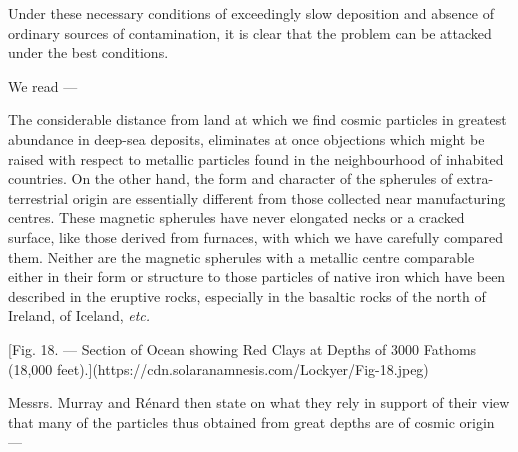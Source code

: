 \documentclass[a4paper, 12pt, oneside, polutonikogreek, english]{article}
\begin{document}
Under these necessary conditions of exceedingly slow deposition and absence of ordinary sources of contamination, it is clear that the problem can be attacked under the best conditions.

We read ---

The considerable distance from land at which we find cosmic particles in greatest abundance in deep-sea deposits, eliminates at once objections which might be raised with respect to metallic particles found in the neighbourhood of inhabited countries. On the other hand, the form and character of the spherules of extra-terrestrial origin are essentially different from those collected near manufacturing centres. These magnetic spherules have never elongated necks or a cracked surface, like those derived from furnaces, with which we have carefully compared them. Neither are the magnetic spherules with a metallic centre comparable either in their form or structure to those particles of native iron which have been described in the eruptive rocks, especially in the basaltic rocks of the north of Ireland, of Iceland, \emph{etc.}

[Fig. 18. --- Section of Ocean showing Red Clays at Depths of 3000 Fathoms (18,000 feet).](https://cdn.solaranamnesis.com/Lockyer/Fig-18.jpeg)

Messrs. Murray and Rénard then state on what they rely in support of their view that many of the particles thus obtained from great depths are of cosmic origin ---
\end{document}
